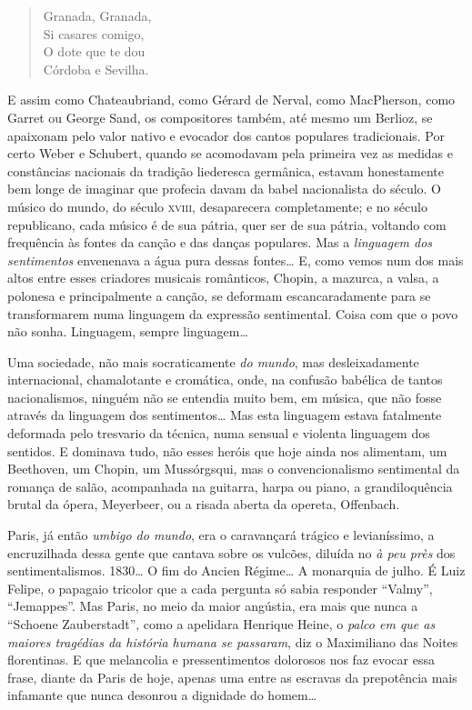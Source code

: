 \begin{verse}
Granada, Granada,\\
Si casares comigo,\\
O dote que te dou\\
Córdoba e Sevilha.
\end{verse}

E assim como Chateaubriand, como Gérard de Nerval, como MacPherson, como
Garret ou George Sand, os compositores também, até mesmo um Berlioz, se
apaixonam pelo valor nativo e evocador dos cantos populares
tradicionais. Por certo Weber e Schubert, quando se acomodavam pela
primeira vez as medidas e constâncias nacionais da tradição
liederesca germânica, estavam honestamente bem longe de imaginar que
profecia davam da babel nacionalista do século. O músico do mundo, do
século \textsc{xviii}, desaparecera completamente; e no século republicano, cada
músico é de sua pátria, quer ser de sua pátria, voltando com frequência
às fontes da canção e das danças populares. Mas a \textit{linguagem dos
sentimentos} envenenava a água pura dessas fontes\ldots{} E, como vemos num
dos mais altos entre esses criadores musicais românticos, Chopin, a
mazurca, a valsa, a polonesa e principalmente a canção, se deformam
escancaradamente para se transformarem numa linguagem da expressão
sentimental. Coisa com que o povo não sonha. Linguagem, sempre
linguagem\ldots{}

Uma sociedade, não mais socraticamente \textit{do mundo}, mas desleixadamente
internacional, chamalotante e cromática, onde, na confusão babélica de
tantos nacionalismos, ninguém não se entendia muito bem, em música, que
não fosse através da linguagem dos sentimentos\ldots{} Mas esta linguagem
estava fatalmente deformada pelo tresvario da técnica, numa sensual e
violenta linguagem dos sentidos. E dominava tudo, não esses heróis que
hoje ainda nos alimentam, um Beethoven, um Chopin, um Mussórgsqui, mas o
convencionalismo sentimental da romança de salão, acompanhada na
guitarra, harpa ou piano, a grandiloquência brutal da ópera, Meyerbeer,
ou a risada aberta da opereta, Offenbach.

Paris, já então \textit{umbigo do mundo}, era o caravançará trágico e
levianíssimo, a encruzilhada dessa gente que cantava sobre os vulcões,
diluída no \textit{à peu près} dos sentimentalismos. 1830\ldots{} O fim do Ancien
Régime\ldots{} A monarquia de julho. É Luiz Felipe, o papagaio tricolor que a
cada pergunta só sabia responder ``Valmy'', ``Jemappes''. Mas Paris, no
meio da maior angústia, era mais que nunca a ``Schoene Zauberstadt'',
como a apelidara Henrique Heine, o \textit{palco em que as maiores tragédias
da história humana se passaram}, diz o Maximiliano das Noites
florentinas. E que melancolia e pressentimentos dolorosos nos faz evocar
essa frase, diante da Paris de hoje, apenas uma entre as escravas da
prepotência mais infamante que nunca desonrou a dignidade do homem\ldots{}


